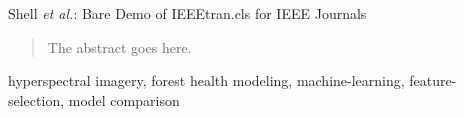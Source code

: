 \documentclass[letterpaper, peerreview]{IEEEtran}
\begin{document}
%
{Shell \MakeLowercase{\textit{et al.}}: Bare Demo of IEEEtran.cls for IEEE Journals}
%

\maketitle

\begin{abstract}
	The abstract goes here.
\end{abstract}

\begin{IEEEkeywords}
	hyperspectral imagery, forest health modeling, machine-learning, feature-selection, model comparison
\end{IEEEkeywords}

\ifCLASSOPTIONpeerreview{}
\fi

\IEEEpeerreviewmaketitle{}
\end{document}
